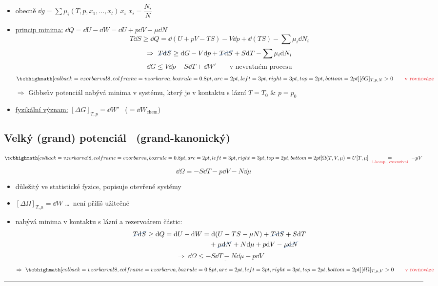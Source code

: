 \begin{itemize}
  \item obecně \quad $\dd g = \sum\mu_i(T,p,x_1,\dots,x_l)\,x_i$ \qquad $x_i = \dfrac{N_i}{N}$
  \item \underline{princip minima:} \qquad $\dd Q = \dd U - \dd W = \dd U + p\dd V - \mu\dd N$
  \[
    T\dd S\geq\dd Q = \dd(U + pV - TS) - V\dd p + \dd(TS) - \sum\mu_i\dd N_i
  \]
  \[
    \Rightarrow\ \cancel{T\dd S}\geq\dd G - V\dd p + \cancel{T\dd S} + S\dd T - \sum\mu_i\dd N_i
  \]
  \[
    \dd G\leq V\dd p - S\dd T + \dd W' \qquad\text{v nevratném procesu}
  \]
  \[
    \vzorec{[\delta G]_{T,p,N} > 0} \qquad \textcolor{Red}{\text{v rovnováze}}
  \]
  $\Rightarrow$ Gibbsův potenciál nabývá minima v systému, který je v kontaktu s lázní $T = T_0$ \&  $p = p_0$
  \item \underline{fyzikální význam:} \quad $[\Delta G]_{T,p} = \dd W'$ \ ($= \dd W_{\text{chem}}$)
\end{itemize}

\subsection{Velký (grand) potenciál \ (grand-kanonický)}
\begin{definice}
\[
  \vzorec{\Omega(T,V,\mu) = U[T,\mu]} \ \underset{\textcolor{Red}{\text{1-komp., extenzivní}}}{=}\ -pV
\]
\[
  \dd\Omega = -S\dd T - p\dd V - N\dd\mu
\]
\end{definice}
\begin{itemize}
  \item důležitý ve statistické fyzice, popisuje otevřené systémy
  \item $[\Delta\Omega]_{T,\mu} = \dd W$ \quad\dots\ není příliš užitečné
  \item nabývá minima v kontaktu s lázní a rezervoárem částic:
  \begin{align*}
    \cancel{T\dd S}\geq\dd Q = \dd U - \dd W &= \dd(U - TS - \mu N) + \cancel{T\dd S} + S\dd T \\
    &\quad + \cancel{\mu\dd N} + N\dd\mu + p\dd V - \cancel{\mu\dd N}
  \end{align*}
  \[
    \Rightarrow\ \underline{\dd\Omega\leq -S\dd T - N\dd\mu - p\dd V}
  \]
  \[
    \Rightarrow\ \vzorec{[\delta\Omega]_{T,\mu,V} > 0} \qquad \textcolor{Red}{\text{v rovnováze}}
  \]
\end{itemize}
\begin{center}\rule{0.6\linewidth}{0.4pt}\end{center}

